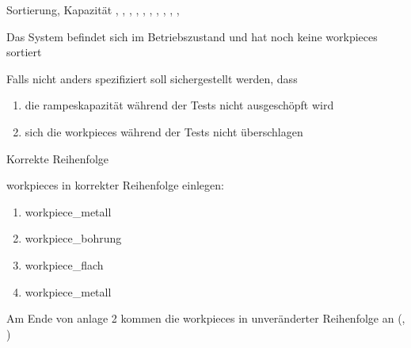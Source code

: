 \begin{abntest}{Sortierung, Kapazität}{
    ,
    ,
    ,
    ,
    ,
    , %
    ,
    ,
    ,
    ,
}{
    \item Das System befindet sich im Betriebszustand und hat noch keine \glspl{workpiece} sortiert
    \item Falls nicht anders spezifiziert soll sichergestellt werden, dass
    \begin{enumerate}
        \item die \glspl{rampe}kapazität während der Tests nicht ausgeschöpft wird
        \item sich die \glspl{workpiece} während der Tests nicht überschlagen
    \end{enumerate}
}
    \label{abntest-sortierung-kapazitaet}

    \begin{ablauf}{Korrekte Reihenfolge}
        \item \Glspl{workpiece} in korrekter Reihenfolge einlegen:
        \begin{enumerate}
            \item \gls{workpiece_metall}
            \item \gls{workpiece_bohrung}
            \item \gls{workpiece_flach}
            \item \gls{workpiece_metall}
        \end{enumerate}
    \end{ablauf}

    \erwartungText
    Am Ende von \gls{anlage} 2 kommen die \Glspl{workpiece} in
    unveränderter Reihenfolge an (, )


\end{abntest}
